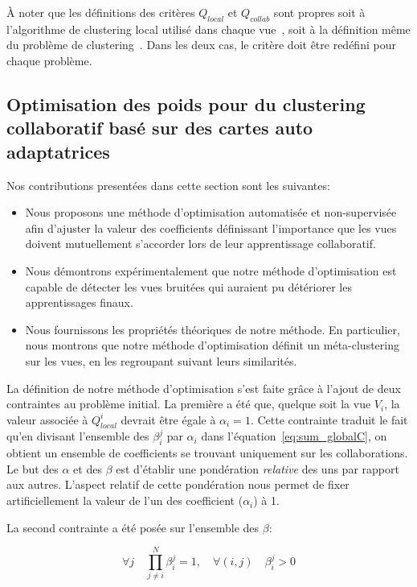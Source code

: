 \documentclass[a4paper]{article}
\begin{document}
À noter que les définitions des critères $Q_{local}$ et $Q_{collab}$ sont propres soit à l'algorithme de clustering local utilisé dans chaque vue~\cite{ghassany2012collaborative}, soit à la définition même du problème de clustering~\cite{sublime2018information}. Dans les deux cas, le critère doit être redéfini pour chaque problème.

\subsection{Optimisation des poids pour du clustering collaboratif basé sur des cartes auto adaptatrices}

Nos contributions presentées dans cette section sont les suivantes:
\begin{itemize}
    \item Nous proposons une méthode d'optimisation automatisée et non-supervisée afin d'ajuster la valeur des coefficients définissant l'importance que les vues doivent mutuellement s'accorder lors de leur apprentissage collaboratif.
    \item Nous démontrons expérimentalement que notre méthode d'optimisation est capable de détecter les vues bruitées qui auraient pu détériorer les apprentissages finaux.
    \item Nous fournissons les propriétés théoriques de notre méthode. En particulier, nous montrons que notre méthode d'optimisation définit un méta-clustering sur les vues, en les regroupant suivant leurs similarités.
\end{itemize}

La définition de notre méthode d'optimisation s'est faite grâce à l'ajout de deux contraintes au problème initial. La première a été que, quelque soit la vue $V_i$, la valeur associée à $Q^i_{local}$ devrait être égale à $\alpha_i=1$. Cette contrainte traduit le fait qu'en divisant l'ensemble des $\beta^j_i$ par $\alpha_i$ dans l'équation~\ref{eq:sum_globalC}, on obtient un ensemble de coefficients se trouvant uniquement sur les collaborations. Le but des $\alpha$ et des $\beta$ est d'établir une pondération \textit{relative} des uns par rapport aux autres. L'aspect relatif de cette pondération nous permet de fixer artificiellement la valeur de l'un des coefficient ($\alpha_i$) à 1.

La second contrainte a été posée sur l'ensemble des $\beta$:

\begin{equation}
    \forall j \quad \prod_{j \neq i}^N \beta^j_i = 1, \quad
    \forall (i,j) \quad \beta^j_i >0 
\end{equation}
\end{document}
